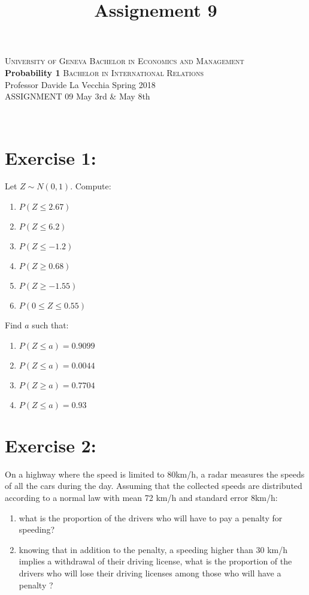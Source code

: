 \documentclass[12pt,thmsa]{article}
\title{Assignement 9}
\begin{document}
\noindent \textsc{University of Geneva}     \hfill \textsc{Bachelor in Economics and Management} \\
\textbf{Probability 1}                      \hfill \textsc{Bachelor in International Relations} \\
Professor Davide La Vecchia                 \hfill Spring 2018  \\
ASSIGNMENT 09                               \hfill   May 3rd \& May 8th



\noindent
\makebox[\linewidth]{\rule{\textwidth}{0.4pt}}\\[1.5ex]


\section{Exercise 1:}


Let $Z \sim N(0,1)$. Compute:
\begin{enumerate}
\item $ P(Z \leq 2.67)$
\item $P(Z \leq 6.2)$
\item $ P(Z \leq -1.2)$
\item $ P(Z \geq 0.68)$
\item $P(Z \geq - 1.55)$
\item $ P( 0 \leq Z \leq 0.55)$
\end{enumerate}

Find $a$ such that:
\begin{enumerate}
\item  $P(Z \leq a) = 0.9099$
\item $P( Z \leq a ) = 0.0044$
\item $P( Z \geq a ) = 0.7704$
\item $P( Z \leq a ) = 0.93 $
\end{enumerate}



\section*{Exercise 2:}

On a highway where the speed is limited to 80km/h, a radar measures the speeds of all the cars during the day. Assuming that the collected speeds are distributed according to a normal law with mean
72 km/h and standard error 8km/h:
\begin{enumerate}
  \item what is the proportion of the drivers who will have to pay a penalty for speeding?
  \item knowing that in addition to the penalty, a speeding higher than 30 km/h implies a withdrawal of their driving license, what is the proportion of the drivers who will lose their driving
  licenses among those who will have a penalty ?
\end{enumerate}
\end{document}
